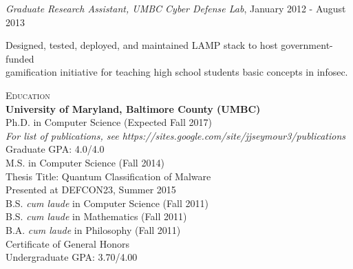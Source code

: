 \btab \textit{Graduate Research Assistant, UMBC Cyber Defense Lab}, January 2012 - August 2013\\
\begin{my_list}
\item Designed, tested, deployed, and maintained LAMP stack to host government-funded\\ \tab \tab gamification initiative for teaching high school students basic concepts in infosec.
\end{my_list}

\medskip
\textsc{Education}\\
\atab \textbf{University of Maryland, Baltimore County (UMBC)}\\
\btab Ph.D. in Computer Science (Expected Fall 2017)\\
\ctab \emph{For list of publications, see https://sites.google.com/site/jjseymour3/publications}\\
\ctab Graduate GPA: 4.0/4.0\\
\btab M.S. in Computer Science (Fall 2014)\\
\ctab Thesis Title: Quantum Classification of Malware\\
\ctab Presented at DEFCON23, Summer 2015\\
\btab B.S. \emph{cum laude} in Computer Science (Fall 2011)\\
\btab B.S. \emph{cum laude} in Mathematics (Fall 2011) \\
\btab B.A. \emph{cum laude} in Philosophy (Fall 2011)\\
\btab Certificate of General Honors\\
\ctab Undergraduate GPA: 3.70/4.00\\

